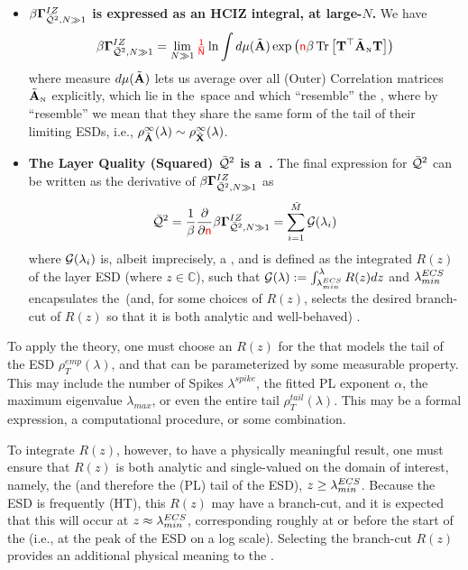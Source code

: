 \begin{itemize}
  \item
  \textbf{$\beta\mathbf{\Gamma}^{IZ}_{\bar{\mathcal{Q}}^{2},N\gg 1}$ is expressed as an HCIZ integral, at large-$N$.}
  We have
  \begin{align}
  \label{eqn:IZGINF_HCIZ}
  \IZGINF = \lim_{N\gg 1}\red{\tfrac{1}{N}}\ln\int d\mu(\AECS)\exp\left(\ND\beta\Trace{\TMAT^{\TR}\AECSN\TMAT}\right) %
  \end{align}
  where  measure $d\mu(\tilde{\mathbf{A}})$ lets us average over all (Outer) \Student Correlation matrices $\tilde{\mathbf{A}}_{\text{\tiny N}}$ explicitly, which
  lie in the~\ECS space and which ``resemble'' the \Teacher, 
  where by ``resemble'' we mean that they share the same form of the tail of
  their limiting ESDs,
  i.e., $\rho^{\infty}_{\tilde{\mathbf{A}}}(\lambda)\sim\rho^{\infty}_{\tilde{\mathbf{X}}}(\lambda)$.
  \item
  \textbf{The Layer Quality (Squared) $\bar{\mathcal{Q}}^{2}$ is a~\GEN.}
  The final expression for $\bar{\mathcal{Q}}^{2}$ can be written as the derivative of $\beta\mathbf{\Gamma}^{IZ}_{\bar{\mathcal{Q}}^{2},N\gg 1}$  as
  \begin{align}
    \label{eqn:QT_result}
    \bar{\mathcal{Q}}^{2} = \dfrac{1}{\beta}\dfrac{\partial}{\partial {\color{red}\sf{n}}}\beta\mathbf{\Gamma}^{IZ}_{\bar{\mathcal{Q}}^{2},N\gg 1} = \sum_{i=1}^{\tilde{M}}\mathcal{G}(\lambda_{i})
  \end{align}
  where $\mathcal{G}(\lambda_{i})$ is, albeit imprecisely, a \emph{\GEN}, and is  defined as the integrated \emph{\RTransform} $R(z)$ of the \Teacher
  layer ESD (where $z\in\mathbb{C}$), such that $\mathcal{G(\lambda)}:= \int_{\lambda^{ECS}_{min}}^{\lambda}R(z)dz$
  and $\lambda^{ECS}_{min}$  encapsulates  the~\ECS (and, for some choices of $R(z)$,  selects the desired branch-cut of $R(z)$
  so that it is both analytic and well-behaved) .
\end{itemize}

To apply the theory, one must choose an \RTransform $R(z)$ for	the \Teacher that models 
the tail of the ESD $\rho^{emp}_{T}(\lambda)$, and that can be
parameterized by some measurable property.
This may include the number of Spikes $\lambda^{spike}$, the fitted PL exponent $\alpha$,
the maximum eigenvalue $\lambda_{max}$, or even the entire tail $\rho^{tail}_{T}(\lambda)$.
This may be a formal expression, a computational procedure, or some combination.

To integrate $R(z)$, however, to have a physically meaningful result,
one must ensure that $R(z)$ is both
analytic and single-valued on the domain of interest, namely, the \ECS (and therefore
the (PL) tail of the ESD),  $z \ge \lambda^{ECS}_{min}$.
Because the ESD is frequently \HeavyTailed (HT), this
\RTransform $R(z)$ may have a branch-cut, and it is expected that this will occur
at $z\approx\lambda^{ECS}_{min}$, corresponding roughly at or before the start of the \ECS (i.e., at the peak of the ESD on a log scale).
Selecting the branch-cut $R(z)$ provides an additional physical meaning to the \ECS.

